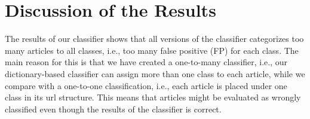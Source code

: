 \section{Discussion of the Results}
The results of our classifier shows that all versions of the classifier categorizes too many articles to all classes, i.e., too many false positive (FP) for each class. The main reason for this is that we have created a one-to-many classifier, i.e., our dictionary-based classifier can assign more than one class to each article, while we compare with a one-to-one classification, i.e., each article is placed under one class in its url structure. This means that articles might be evaluated as wrongly classified even though the results of the classifier is correct. 

\begin{comment}


There are many reasons why the results are 


- dårlig 
- flere klassser
- tvetydige ord. 


are 2 main reasons for this: 
\begin{enumerate}
\item Many articles concern more than one topic: An article about a musician playing golf would be most likely be categorized as both entertainment and sports by our classifier, while the journalist publishing the article would have to choose the category within the url structure.  
\item The required number of keywords for assigning a class is too low: We could all occurrences of keywords within the class, and it might be more realistic to put a lower limit before the category is assigned to the article. 
\end{enumerate}


\end{comment}
